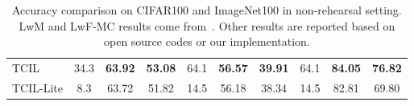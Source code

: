 \documentclass[letterpaper]{article} %
\begin{document}
\begin{table}
{\begin{tabular}{@{}l|cccccc|ccc@{}}
TCIL                                                   & 34.3             & \textbf{63.92} & \multicolumn{1}{c|}{\textbf{53.08}} & 64.1             & \textbf{56.57} & \textbf{39.91} & 64.1             & \textbf{84.05} & \textbf{76.82} \\
TCIL-Lite                                              & 8.3              & 63.72          & \multicolumn{1}{c|}{51.82}          & 14.5             & 56.18          & 38.34          & 14.5             & 82.81          & 69.80          \\ \bottomrule
\end{tabular}
}
\caption{Accuracy comparison on CIFAR100 and ImageNet100 in non-rehearsal setting. LwM and LwF-MC results come from~\cite{p24}. Other results are reported based on open source codes or our implementation.}
\label{mem_free}
\end{table}
\end{document}
